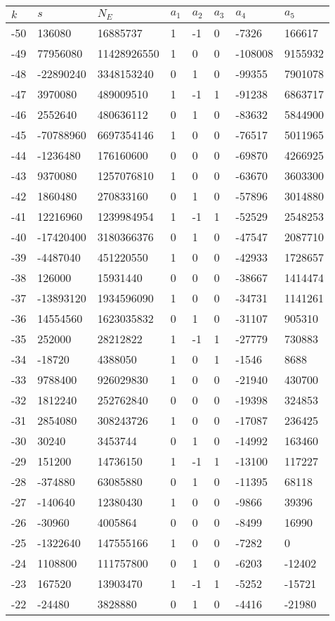 \documentclass{amsart}
\begin{document}
\begin{longtable}{|l|l|l|lllll|}
\hline
$k$ & $s$ & $N_E$ & $a_1$ & $a_2$ & $a_3$ & $a_4$ & $a_5$\\
\hline
-50&136080&16885737&1&-1&0&-7326&166617\\
-49&77956080&11428926550&1&0&0&-108008&9155932\\
-48&-22890240&3348153240&0&1&0&-99355&7901078\\
-47&3970080&489009510&1&-1&1&-91238&6863717\\
-46&2552640&480636112&0&1&0&-83632&5844900\\
-45&-70788960&6697354146&1&0&0&-76517&5011965\\
-44&-1236480&176160600&0&0&0&-69870&4266925\\
-43&9370080&1257076810&1&0&0&-63670&3603300\\
-42&1860480&270833160&0&1&0&-57896&3014880\\
-41&12216960&1239984954&1&-1&1&-52529&2548253\\
-40&-17420400&3180366376&0&1&0&-47547&2087710\\
-39&-4487040&451220550&1&0&0&-42933&1728657\\
-38&126000&15931440&0&0&0&-38667&1414474\\
-37&-13893120&1934596090&1&0&0&-34731&1141261\\
-36&14554560&1623035832&0&1&0&-31107&905310\\
-35&252000&28212822&1&-1&1&-27779&730883\\
-34&-18720&4388050&1&0&1&-1546&8688\\
-33&9788400&926029830&1&0&0&-21940&430700\\
-32&1812240&252762840&0&0&0&-19398&324853\\
-31&2854080&308243726&1&0&0&-17087&236425\\
-30&30240&3453744&0&1&0&-14992&163460\\
-29&151200&14736150&1&-1&1&-13100&117227\\
-28&-374880&63085880&0&1&0&-11395&68118\\
-27&-140640&12380430&1&0&0&-9866&39396\\
-26&-30960&4005864&0&0&0&-8499&16990\\
-25&-1322640&147555166&1&0&0&-7282&0\\
-24&1108800&111757800&0&1&0&-6203&-12402\\
-23&167520&13903470&1&-1&1&-5252&-15721\\
-22&-24480&3828880&0&1&0&-4416&-21980\\

\end{longtable}
\end{document}
